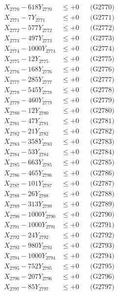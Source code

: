 \documentclass[a4paper,10pt]{article}
\begin{document}
{\begin{align}
X_{2770} - 618Y_{2770} &\leq +0 && \text{(G2770)} \\
\allowbreak
X_{2771} - 7Y_{2771} &\leq +0 && \text{(G2771)} \\
X_{2772} - 577Y_{2772} &\leq +0 && \text{(G2772)} \\
X_{2773} - 497Y_{2773} &\leq +0 && \text{(G2773)} \\
X_{2774} - 1000Y_{2774} &\leq +0 && \text{(G2774)} \\
X_{2775} - 12Y_{2775} &\leq +0 && \text{(G2775)} \\
X_{2776} - 168Y_{2776} &\leq +0 && \text{(G2776)} \\
X_{2777} - 285Y_{2777} &\leq +0 && \text{(G2777)} \\
X_{2778} - 545Y_{2778} &\leq +0 && \text{(G2778)} \\
X_{2779} - 460Y_{2779} &\leq +0 && \text{(G2779)} \\
X_{2780} - 12Y_{2780} &\leq +0 && \text{(G2780)} \\
\allowbreak
X_{2781} - 47Y_{2781} &\leq +0 && \text{(G2781)} \\
X_{2782} - 21Y_{2782} &\leq +0 && \text{(G2782)} \\
X_{2783} - 358Y_{2783} &\leq +0 && \text{(G2783)} \\
X_{2784} - 53Y_{2784} &\leq +0 && \text{(G2784)} \\
X_{2785} - 663Y_{2785} &\leq +0 && \text{(G2785)} \\
X_{2786} - 465Y_{2786} &\leq +0 && \text{(G2786)} \\
X_{2787} - 101Y_{2787} &\leq +0 && \text{(G2787)} \\
X_{2788} - 26Y_{2788} &\leq +0 && \text{(G2788)} \\
X_{2789} - 313Y_{2789} &\leq +0 && \text{(G2789)} \\
X_{2790} - 1000Y_{2790} &\leq +0 && \text{(G2790)} \\
\allowbreak
X_{2791} - 1000Y_{2791} &\leq +0 && \text{(G2791)} \\
X_{2792} - 24Y_{2792} &\leq +0 && \text{(G2792)} \\
X_{2793} - 980Y_{2793} &\leq +0 && \text{(G2793)} \\
X_{2794} - 1000Y_{2794} &\leq +0 && \text{(G2794)} \\
X_{2795} - 752Y_{2795} &\leq +0 && \text{(G2795)} \\
X_{2796} - 207Y_{2796} &\leq +0 && \text{(G2796)} \\
X_{2797} - 85Y_{2797} &\leq +0 && \text{(G2797)} \\

\end{align}}
\end{document}
